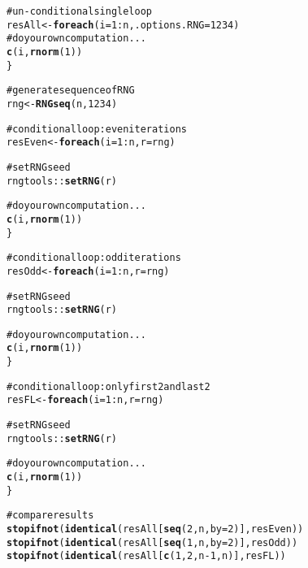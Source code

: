 \documentclass[a4paper,12pt]{article}\usepackage{graphicx, color}
\makeatletter
\newcommand{\hlfunctioncall}[1]{\textcolor[rgb]{0.501960784313725,0,0.329411764705882}{\textbf{#1}}}%
\newcommand{\hlcomment}[1]{\textcolor[rgb]{0.180392156862745,0.6,0.341176470588235}{#1}}%
\newenvironment{kframe}{%
 \def\at@end@of@kframe{}%
 \ifinner\ifhmode%
  \def\at@end@of@kframe{\end{minipage}}%
  \begin{minipage}{\columnwidth}%
 \fi\fi%
 \def\FrameCommand##1{\hskip\@totalleftmargin \hskip-\fboxsep
 \colorbox{shadecolor}{##1}\hskip-\fboxsep
     \hskip-\linewidth \hskip-\@totalleftmargin \hskip\columnwidth}%
 \MakeFramed {\advance\hsize-\width
   \@totalleftmargin\z@ \linewidth\hsize
   \@setminipage}}%
 {\par\unskip\endMakeFramed%
 \at@end@of@kframe}
\newenvironment{knitrout}{}{} %
\renewenvironment{knitrout}{\begin{footnotesize}}{\end{footnotesize}}
\makeatother
\begin{document}
\begin{knitrout}
\color{fgcolor}\begin{kframe}
\begin{alltt}

\hlcomment{# un-conditional single loop}
resAll <- \hlfunctioncall{foreach}(i = 1:n, .options.RNG = 1234) %dorng% \{
    \hlcomment{# do your own computation ...}
    \hlfunctioncall{c}(i, \hlfunctioncall{rnorm}(1))
\}

\hlcomment{# generate sequence of RNG}
rng <- \hlfunctioncall{RNGseq}(n, 1234)

\hlcomment{# conditional loop: even iterations}
resEven <- \hlfunctioncall{foreach}(i = 1:n, r = rng) %:% \hlfunctioncall{when}(i%%2 == 0) %dopar% \{
    
    \hlcomment{# set RNG seed}
    rngtools::\hlfunctioncall{setRNG}(r)
    
    \hlcomment{# do your own computation ...}
    \hlfunctioncall{c}(i, \hlfunctioncall{rnorm}(1))
\}

\hlcomment{# conditional loop: odd iterations}
resOdd <- \hlfunctioncall{foreach}(i = 1:n, r = rng) %:% \hlfunctioncall{when}(i%%2 == 1) %dopar% \{
    
    \hlcomment{# set RNG seed}
    rngtools::\hlfunctioncall{setRNG}(r)
    
    \hlcomment{# do your own computation ...}
    \hlfunctioncall{c}(i, \hlfunctioncall{rnorm}(1))
\}

\hlcomment{# conditional loop: only first 2 and last 2}
resFL <- \hlfunctioncall{foreach}(i = 1:n, r = rng) %:% \hlfunctioncall{when}(i %in% \hlfunctioncall{c}(1, 2, n - 1, n)) %dopar% \{
    
    \hlcomment{# set RNG seed}
    rngtools::\hlfunctioncall{setRNG}(r)
    
    \hlcomment{# do your own computation ...}
    \hlfunctioncall{c}(i, \hlfunctioncall{rnorm}(1))
\}

\hlcomment{# compare results}
\hlfunctioncall{stopifnot}(\hlfunctioncall{identical}(resAll[\hlfunctioncall{seq}(2, n, by = 2)], resEven))
\hlfunctioncall{stopifnot}(\hlfunctioncall{identical}(resAll[\hlfunctioncall{seq}(1, n, by = 2)], resOdd))
\hlfunctioncall{stopifnot}(\hlfunctioncall{identical}(resAll[\hlfunctioncall{c}(1, 2, n - 1, n)], resFL))
\end{alltt}
\end{kframe}
\end{knitrout}
\end{document}
